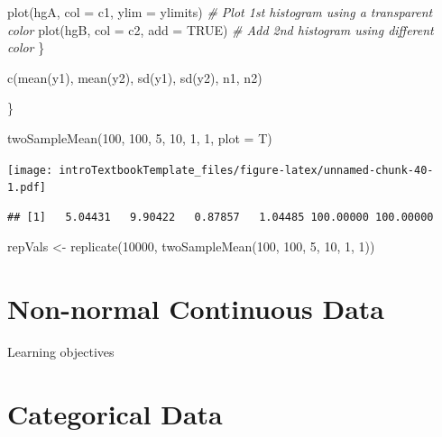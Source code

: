 \documentclass[
]{book}
\newenvironment{Shaded}{\begin{snugshade}}{\end{snugshade}}
\newcommand{\AttributeTok}[1]{\textcolor[rgb]{0.77,0.63,0.00}{#1}}
\newcommand{\CommentTok}[1]{\textcolor[rgb]{0.56,0.35,0.01}{\textit{#1}}}
\newcommand{\ConstantTok}[1]{\textcolor[rgb]{0.00,0.00,0.00}{#1}}
\newcommand{\DecValTok}[1]{\textcolor[rgb]{0.00,0.00,0.81}{#1}}
\newcommand{\FunctionTok}[1]{\textcolor[rgb]{0.00,0.00,0.00}{#1}}
\newcommand{\NormalTok}[1]{#1}
\newcommand{\OtherTok}[1]{\textcolor[rgb]{0.56,0.35,0.01}{#1}}
\theoremstyle{definition}
\theoremstyle{definition}
\theoremstyle{definition}
\theoremstyle{remark}
\begin{document}
\begin{Shaded}
\begin{Highlighting}[]
    \FunctionTok{plot}\NormalTok{(hgA, }\AttributeTok{col =}\NormalTok{ c1, }\AttributeTok{ylim =}\NormalTok{ ylimits)}
    \CommentTok{\# Plot 1st histogram using a transparent color}
    \FunctionTok{plot}\NormalTok{(hgB, }\AttributeTok{col =}\NormalTok{ c2, }\AttributeTok{add =} \ConstantTok{TRUE}\NormalTok{)}
    \CommentTok{\# Add 2nd histogram using different color}
\NormalTok{  \}}
  
  \FunctionTok{c}\NormalTok{(}\FunctionTok{mean}\NormalTok{(y1), }\FunctionTok{mean}\NormalTok{(y2), }\FunctionTok{sd}\NormalTok{(y1), }\FunctionTok{sd}\NormalTok{(y2), n1, n2)}
  
\NormalTok{\}}

\FunctionTok{twoSampleMean}\NormalTok{(}\DecValTok{100}\NormalTok{, }\DecValTok{100}\NormalTok{, }\DecValTok{5}\NormalTok{, }\DecValTok{10}\NormalTok{, }\DecValTok{1}\NormalTok{, }\DecValTok{1}\NormalTok{, }\AttributeTok{plot =}\NormalTok{ T)}
\end{Highlighting}
\end{Shaded}

\texttt{[image: introTextbookTemplate\_files/figure-latex/unnamed-chunk-40-1.pdf]}

\begin{verbatim}
## [1]   5.04431   9.90422   0.87857   1.04485 100.00000 100.00000
\end{verbatim}

\begin{Shaded}
\begin{Highlighting}[]
\NormalTok{repVals }\OtherTok{\textless{}{-}} \FunctionTok{replicate}\NormalTok{(}\DecValTok{10000}\NormalTok{, }\FunctionTok{twoSampleMean}\NormalTok{(}\DecValTok{100}\NormalTok{, }\DecValTok{100}\NormalTok{, }\DecValTok{5}\NormalTok{, }\DecValTok{10}\NormalTok{, }\DecValTok{1}\NormalTok{, }\DecValTok{1}\NormalTok{))}
\end{Highlighting}
\end{Shaded}

\hypertarget{ch9}{%
\chapter{Non-normal Continuous Data}\label{ch9}}

Learning objectives

\hypertarget{ch10}{%
\chapter{Categorical Data}\label{ch10}}
\end{document}
